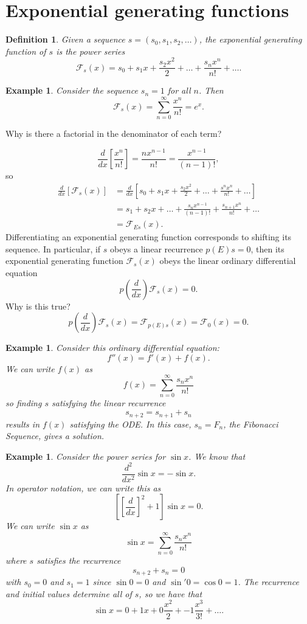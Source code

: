 \documentclass[11pt]{article}
\newtheorem{definition}[theorem]{Definition}
\newtheorem{example}[theorem]{Example}
\begin{document}
\section{Exponential generating functions}

\begin{definition}
Given a sequence $s = (s_0,s_1,s_2,\dots)$, the exponential generating function of $s$ is the power series
$$\mathcal{F}_s(x) = s_0 + s_1x + \frac{s_2x^2}{2} + \ldots + \frac{s_nx^n}{n!} + \ldots.$$
\end{definition}

\begin{example}
Consider the sequence $s_n = 1$ for all $n$.  Then
$$\mathcal{F}_s(x) = \sum_{n=0}^{\infty}{\frac{x^n}{n!}} = e^x.$$
\end{example}

Why is there a factorial in the denominator of each term?

$$\frac{d}{dx}\left[\frac{x^n}{n!}\right] = \frac{nx^{n-1}}{n!} = \frac{x^{n-1}}{(n-1)!},$$
so
$$
\begin{aligned}
\frac{d}{dx}[\mathcal{F}_s(x)] &= \frac{d}{dx}\left[s_0 + s_1x + \frac{s_2x^2}{2} + \ldots + \frac{s^nx^n}{n!} + \ldots\right] \\
                               &= s_1 + s_2x + \ldots + \frac{s_nx^{n-1}}{(n-1)!} + \frac{s_{n+1}x^n}{n!} + \ldots \\
                               &= \mathcal{F}_{Es}(x).
\end{aligned}
$$
Differentiating an exponential generating function corresponds to shifting its sequence.  In particular, if $s$ obeys a linear recurrence $p(E)s = 0$, then its exponential generating function $\mathcal{F}_s(x)$ obeys the linear ordinary differential equation
$$p\left(\frac{d}{dx}\right)\mathcal{F}_s(x) = 0.$$
Why is this true?
$$p\left(\frac{d}{dx}\right)\mathcal{F}_s(x) = \mathcal{F}_{p(E)s}(x) = \mathcal{F}_0(x) = 0.$$

\begin{example}
Consider this ordinary differential equation:
$$f''(x) = f'(x) + f(x).$$
We can write $f(x)$ as
$$f(x) = \sum_{n=0}^{\infty}{\frac{s_nx^n}{n!}}$$
so finding $s$ satisfying the linear recurrence
$$s_{n+2} = s_{n+1} + s_n$$
results in $f(x)$ satisfying the ODE.  In this case, $s_n = F_n$, the Fibonacci Sequence, gives a solution.
\end{example}

\begin{example}
Consider the power series for $\sin{x}$.  We know that
$$\frac{d^2}{dx^2}\sin{x} = -\sin{x}.$$
In operator notation, we can write this as
$$\left[\left[\frac{d}{dx}\right]^2+1\right]\sin{x} = 0.$$
We can write $\sin{x}$ as
$$\sin{x} = \sum_{n=0}^{\infty}{\frac{s_nx^n}{n!}}$$
where $s$ satisfies the recurrence
$$s_{n+2} + s_n = 0$$
with $s_0 = 0$ and $s_1 = 1$ since $\sin{0} = 0$ and $\sin'{0} = \cos{0} = 1$.  The recurrence and initial values determine all of $s$, so we have that
$$\sin{x} = 0 + 1x + 0\frac{x^2}{2} + -1\frac{x^3}{3!} + \ldots.$$
\end{example}
\end{document}
